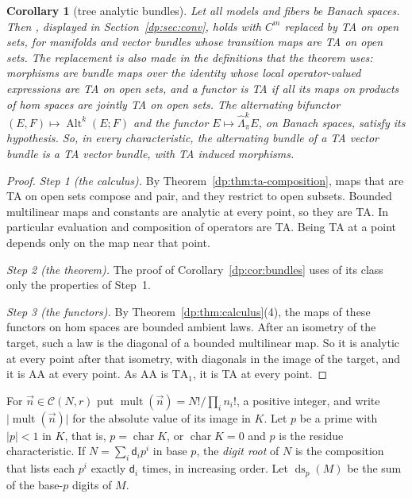 \documentclass[11pt]{amsart}
\newtheorem{corollary}[theorem]{Corollary}
\theoremstyle{definition}
\theoremstyle{remark}
\numberwithin{equation}{section}
\newcommand{\Alt}{\operatorname{Alt}}
\newcommand{\abs}[1]{\lvert #1\rvert}
\theoremstyle{plain}
\theoremstyle{definition}
\theoremstyle{plain}
\newcommand{\hLambda}{\widehat\Lambda}
\begin{document}
\begin{corollary}[tree analytic bundles]\label{dp:cor:ta-bundles}
Let all models and fibers be Banach spaces. Then \cite[Theorem~2.1]{I}, displayed in Section~\ref{dp:sec:conv}, holds with $C^m$ replaced by TA on open sets, for manifolds and vector bundles whose transition maps are TA on open sets. The replacement is also made in the definitions that the theorem uses: morphisms are bundle maps over the identity whose local operator-valued expressions are TA on open sets, and a functor is TA if all its maps on products of hom spaces are jointly TA on open sets. The alternating bifunctor $(E,F)\mapsto\Alt^k(E;F)$ and the functor $E\mapsto\hLambda^k_\pi E$, on Banach spaces, satisfy its hypothesis. So, in every characteristic, the alternating bundle of a TA vector bundle is a TA vector bundle, with TA induced morphisms.
\end{corollary}

\begin{proof}
\emph{Step 1 (the calculus).} By Theorem~\ref{dp:thm:ta-composition}, maps that are TA on open sets compose and pair, and they restrict to open subsets. Bounded multilinear maps and constants are analytic at every point, so they are TA. In particular evaluation and composition of operators are TA. Being TA at a point depends only on the map near that point.

\emph{Step 2 (the theorem).} The proof of Corollary~\ref{dp:cor:bundles} uses of its class only the properties of Step~1.

\emph{Step 3 (the functors).} By Theorem~\ref{dp:thm:calculus}(4), the maps of these functors on hom spaces are bounded ambient laws. After an isometry of the target, such a law is the diagonal of a bounded multilinear map. So it is analytic at every point after that isometry, with diagonals in the image of the target, and it is AA at every point. As AA is $\mathrm{TA}_1$, it is TA at every point.
\end{proof}

For $\vec n\in\mathcal C(N,r)$ put $\operatorname{mult}(\vec n)=N!/\prod_in_i!$, a positive integer, and write $\abs{\operatorname{mult}(\vec n)}$ for the absolute value of its image in $K$. Let $p$ be a prime with $\abs p<1$ in $K$, that is, $p=\operatorname{char}K$, or $\operatorname{char}K=0$ and $p$ is the residue characteristic. If $N=\sum_i\mathsf d_ip^i$ in base $p$, the \emph{digit root} of $N$ is the composition that lists each $p^i$ exactly $\mathsf d_i$ times, in increasing order. Let $\operatorname{ds}_p(M)$ be the sum of the base-$p$ digits of $M$.
\end{document}
